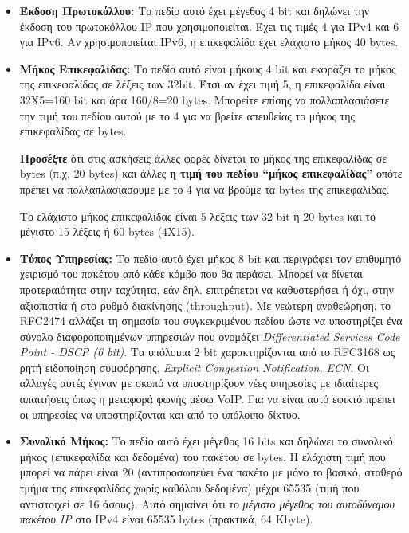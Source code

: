 \begin{itemize}
\item \textbf{Έκδοση Πρωτοκόλλου:} Το πεδίο αυτό έχει μέγεθος 4 bit και δηλώνει την έκδοση του πρωτοκόλλου IP που χρησιμοποιείται. Έχει τις τιμές 4 για IPv4 και 6 για IPv6. Αν χρησιμοποιείται IPv6, η επικεφαλίδα έχει ελάχιστο μήκος 40 bytes.
\item \textbf{Μήκος Επικεφαλίδας:} Το πεδίο αυτό είναι μήκους 4 bit και εκφράζει το μήκος της επικεφαλίδας σε λέξεις των 32bit. Έτσι αν έχει τιμή 5, η επικεφαλίδα είναι 32Χ5=160 bit και άρα 160/8=20 bytes. Μπορείτε επίσης να πολλαπλασιάσετε την τιμή του πεδίου αυτού με το 4 για να βρείτε απευθείας το μήκος της επικεφαλίδας σε bytes.

\begin{inthebox}
\textbf{Προσέξτε} ότι στις ασκήσεις άλλες φορές δίνεται το μήκος της επικεφαλίδας σε bytes (π.χ. 20 bytes) και άλλες \textbf{η τιμή του πεδίου ``μήκος επικεφαλίδας''} οπότε πρέπει να πολλαπλασιάσουμε με το 4 για να βρούμε τα bytes της επικεφαλίδας.\\
\end{inthebox}

Το ελάχιστο μήκος επικεφαλίδας είναι 5 λέξεις των 32 bit ή 20 bytes και το μέγιστο 15 λέξεις ή 60 bytes (4X15).
\item \textbf{Τύπος Υπηρεσίας:} Το πεδίο αυτό έχει μήκος 8 bit και περιγράφει τον επιθυμητό χειρισμό του πακέτου από κάθε κόμβο που θα περάσει. Μπορεί να δίνεται προτεραιότητα στην ταχύτητα, εάν δηλ. επιτρέπεται να καθυστερήσει ή όχι, στην αξιοπιστία ή στο ρυθμό διακίνησης (throughput). Με νεώτερη αναθεώρηση, το RFC2474 αλλάζει τη σημασία του συγκεκριμένου πεδίου ώστε να υποστηρίζει ένα σύνολο διαφοροποιημένων υπηρεσιών που ονομάζει \emph{Differentiated Services Code Point - DSCP (6 bit)}. Τα υπόλοιπα 2 bit χαρακτηρίζονται από το RFC3168 ως ρητή ειδοποίηση συμφόρησης, \emph{Explicit Congestion Notification, ECN}. Οι αλλαγές αυτές έγιναν με σκοπό να υποστηρίξουν νέες υπηρεσίες με ιδιαίτερες απαιτήσεις όπως η μεταφορά φωνής μέσω VoIP. Για να είναι αυτό εφικτό πρέπει οι υπηρεσίες να υποστηρίζονται και από το υπόλοιπο δίκτυο. 

\item \textbf{Συνολικό Μήκος:} Το πεδίο αυτό έχει μέγεθος 16 bits και δηλώνει το συνολικό μήκος (επικεφαλίδα και δεδομένα) του πακέτου σε bytes. Η ελάχιστη τιμή που μπορεί να πάρει είναι 20 (αντιπροσωπεύει ένα πακέτο με μόνο το βασικό, σταθερό τμήμα της επικεφαλίδας χωρίς καθόλου δεδομένα) μέχρι 65535 (τιμή που αντιστοιχεί σε 16 άσους). Αυτό σημαίνει ότι το \emph{μέγιστο μέγεθος του αυτοδύναμου πακέτου IP} στο IPv4 είναι 65535 bytes (πρακτικά, 64 Kbyte).


\end{itemize}
